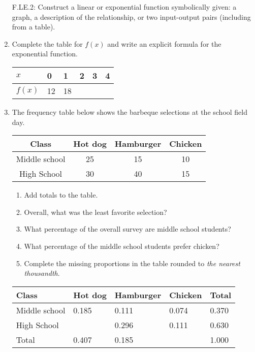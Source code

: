 \documentclass[12pt, twoside]{article}
\begin{document}
\begin{enumerate}[itemsep=0.5cm]
F.LE.2: Construct a linear or exponential function symbolically given: a graph, a description of the relationship, or two input-output pairs (including from a table).
\item Complete the table for $f(x)$ and write an explicit formula for the exponential function.
    \begin{center}
    \begin{tabular}{|p{1cm}|p{1cm}|p{1cm}|p{1cm}|p{1cm}|p{1cm}|}
        \hline
        $x$ & 0 & 1 & 2 & 3 & 4 \\
        \hline
        $f(x)$ & 12 & 18 & & & \\[0.25cm]
        \hline
    \end{tabular}
    \end{center}

\newpage
\item The frequency table below shows the barbeque selections at the school field day.
    \begin{center}
        \begin{tabular}{|c|c|c|c|}
            \hline
            Class & Hot dog & Hamburger & Chicken \\
            \hline
            Middle school & 25 & 15 & 10 \\[0.25cm]
            \hline
            High School & 30 & 40 & 15 \\[0.25cm]
            \hline
        \end{tabular}
    \end{center} \vspace{1cm}
    \begin{enumerate}
        \item Add totals to the table.
        \item Overall, what was the least favorite selection? \vspace{1cm}
        \item What percentage of the overall survey are middle school students? \vspace{2cm}
        \item What percentage of the middle school students prefer chicken? \vspace{2cm}
        \item Complete the missing proportions in the table rounded to \emph{the nearest thousandth}.
    \end{enumerate}
    \begin{center}
        \begin{tabular}{|p{3cm}|p{2cm}|p{2cm}|p{2cm}|p{2cm}|}
            \hline
            Class & Hot dog & Hamburger & Chicken & \quad Total\\
            \hline
            Middle school & 0.185 & 0.111 & 0.074 & 0.370 \\[0.25cm]
            \hline
            High School &  & 0.296 & 0.111 & 0.630 \\[0.25cm]
            \hline
            Total & 0.407 & 0.185 & & 1.000 \\[0.25cm]
            \hline
        \end{tabular}
    \end{center} 


\end{enumerate}
\end{document}
